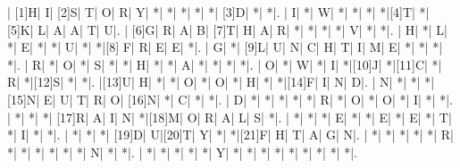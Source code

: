 \renewcommand{\PuzzleNumberFont}{\tt\scriptsize}
\begin{Puzzle}{15}{15}
  | [1]H|   I| [2]S|     T|    O|    R|    Y|   *|    *|    *|       *|    *| [3]D|   *|   *|.
  |    I|   *|    W|     *|    *|    *|    *|[4]T|    *| [5]K|       L|    A|    A|   T|   U|.
  | [6]G|   R|    A|     B| [7]T|    H|    A|   R|    *|    *|       *|    *|    V|   *|   *|.
  |    H|   *|    L|     *|    E|    *|    *|   U|    *|    *|[8]    F|    R|    E|   E|   *|.
  |    G|   *| [9]L|     U|    N|    C|    H|   T|    I|    M|       E|    *|    *|   *|   *|.
  |    R|   *|    O|     *|    S|    *|    *|   H|    *|    *|       A|    *|    *|   *|   *|.
  |    O|   *|    W|     *|    I|    *|[10]J|   *|[11]C|    *|       R|    *|[12]S|   *|   *|.
  |[13]U|   H|    *|     *|    O|    *|    O|   *|    H|    *|       *|[14]F|    I|   N|   D|.
  |    N|   *|    *|     *|[15]N|    E|    U|   T|    R|    O|   [16]N|    *|    C|   *|   *|.
  |    D|   *|    *|     *|    *|    *|    R|   *|    O|    *|       O|    *|    I|   *|   *|.
  |    *|   *|    *| [17]R|    A|    I|    N|   *|[18]M|    O|       R|    A|    L|   S|   *|.
  |    *|   *|    *|     E|    *|    *|    E|   *|    E|    *|       T|    *|    I|   *|   *|.
  |    *|   *|    *| [19]D|    U|[20]T|    Y|   *|    *|[21]F|       H|    T|    A|   G|   N|.
  |    *|   *|    *|     *|    *|    R|    *|   *|    *|    *|       *|    *|    N|   *|   *|.
  |    *|   *|    *|     *|    *|    Y|    *|   *|    *|    *|       *|    *|    *|   *|   *|.
\end{Puzzle}
%
\newenvironment{cwclues}[1]{
  \ignorespaces
  \begin{minipage}[t]{0.44\textwidth}
    {\small \textbf{#1}}
    \footnotesize
    \begin{itemize}[leftmargin=*,topsep=0pt,itemsep=0pt]
      \newcommand{\cwclue}[6]{%
      \item[\texttt{##1}]{##4}~\rule{2em}{.02em}~{##5}
        \textit{{##6}}~\texttt{(##3)}
      }
}{
    \end{itemize}
  \end{minipage}
  \ignorespacesafterend
}
%
\hspace*{\fill}
